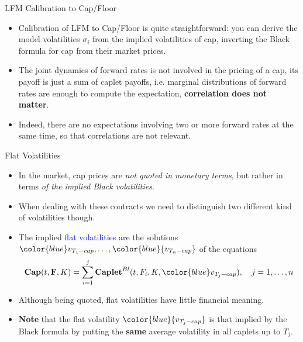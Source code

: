 \documentclass{beamer}
\begin{document}
\begin{frame}{LFM Calibration to Cap/Floor}
	\begin{itemize}
		\item Calibration of LFM to Cap/Floor is quite straightforward: you can derive the model volatilities $\sigma_i$ from the implied volatilities of cap, inverting the Black formula for cap from their market prices.
		\item The \textcolor{maincolor}{joint dynamics of forward rates is not involved in the pricing of a cap}, its payoff is just a sum of caplet payoffs, i.e. marginal distributions of forward rates are enough to compute the expectation, \textbf{correlation does not matter}.
		\item Indeed, there are no expectations involving two or more forward rates at the same time, so that correlations are not relevant.
	\end{itemize}
\end{frame}

\begin{frame}{Flat Volatilities}
	\begin{itemize}
		\item<1-> In the market, cap prices are \emph{not quoted in monetary terms}, but rather in terms \emph{of the implied Black volatilities}.
		\item<1-> When dealing with these contracts we need to distinguish two different kind of volatilities though.
		\item<2-> The implied \textcolor{blue}{flat volatilities} are the solutions ${\color{blue}v_{T_1-cap}},\ldots, \color{blue}{v_{T_n-cap}}$ of the equations
		\begin{equation*}
			\textbf{Cap}(t,\mathbf{F}, K) = \sum_{i=1}^j \textbf{Caplet}^{Bl}(t, F_i, K,{\color{blue}v_{T_j-cap}}),\quad j=1, \ldots,n
		\end{equation*}
		\item<3-> Although being quoted, \textcolor{maincolor}{flat volatilities have little financial meaning}.
		\item<3-> \textbf{Note} that the flat volatility $\color{blue}{v_{T_j-cap}}$ is that implied by the Black formula by putting the \textbf{same} average volatility in all caplets up to $T_j$.
	\end{itemize}
\end{frame}
\end{document}
